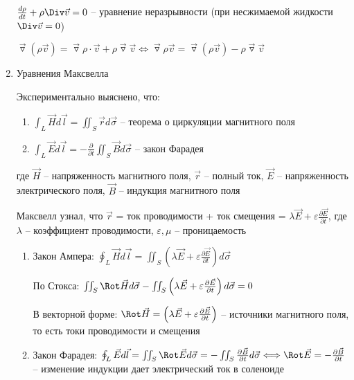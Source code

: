 \documentclass[12pt]{article}
\begin{document}
\begin{enumerate}[label*=\arabic** ]
        $\frac{d\rho}{dt} + \rho \Div \vec{v} = 0$ -- уравнение неразрывности (при несжимаемой жидкости $\Div \vec{v} = 0$)

    $\overrightarrow{\triangledown} (\rho \overrightarrow{v}) = \overrightarrow{\triangledown} \rho \cdot \overrightarrow{v} + \rho \overrightarrow{\triangledown} \overrightarrow{v} \Longleftrightarrow \overrightarrow{\triangledown} \rho \overrightarrow{v} = \overrightarrow{\triangledown} (\rho \overrightarrow{v}) - \rho \overrightarrow{\triangledown} \overrightarrow{v}$
        \item Уравнения Максвелла

        Экспериментально выяснено, что: 
        
        \begin{enumerate}
            \item $\int_L \vec{H} d\vec{l} = \iint_S \vec{r}d\vec{\sigma}$ -- теорема о циркуляции магнитного поля

            \item $\int_L \vec{E} d\vec{l} = -\frac{\partial}{\partial t} \iint_S \vec{B}d\vec{\sigma}$ -- закон Фарадея
        \end{enumerate}

        где $\vec{H}$ -- напряженность магнитного поля, $\vec{r}$ -- полный ток, $\vec{E}$ -- напряженность электрического поля, $\vec{B}$ -- индукция магнитного поля

        Максвелл узнал, что $\vec{r}$ = ток проводимости + ток смещения = $\lambda \vec{E} + \varepsilon \frac{\partial \vec{E}}{\partial t}$, где $\lambda$ -- коэффициент проводимости, $\varepsilon, \mu$ -- проницаемость

        \begin{enumerate}
            \item Закон Ампера: $\oint_L \vec{H} d\vec{l} = \iint_S \left(\lambda \vec{E} + \varepsilon \frac{\partial \vec{E}}{\partial t}\right) d\vec{\sigma}$

            По \Ths Стокса: $\iint_S \Rot \vec{H} d\vec{\sigma} - \iint_S \left(\lambda \vec{E} + \varepsilon \frac{\partial \vec{E}}{\partial t}\right) d\vec{\sigma} = 0$

            В векторной форме: $\Rot \vec{H} = \left(\lambda \vec{E} + \varepsilon \frac{\partial \vec{E}}{\partial t}\right)$ -- источники магнитного поля, то есть токи проводимости и смещения

            \item Закон Фарадея: $\oint_L \vec{E}d\vec{l} = \iint_S \Rot \vec{E}d\vec{\sigma} = -\iint_S \frac{\partial \vec{B}}{\partial t}d\vec{\sigma} \Longleftrightarrow
            \Rot \vec{E} = -\frac{\partial \vec{B}}{\partial t}$ -- изменение индукции дает электрический ток в соленоиде


\end{enumerate}
\end{enumerate}
\end{document}
